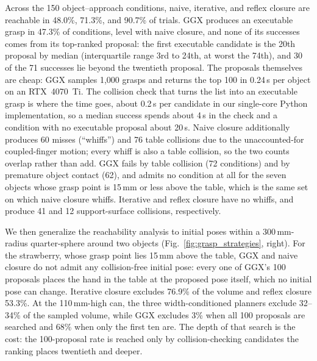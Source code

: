 Across the 150 object--approach conditions, naive, iterative, and
reflex closure are reachable in 48.0\%, 71.3\%, and 90.7\% of trials.
GGX produces an executable grasp in 47.3\% of conditions, level with
naive closure, and none of its successes comes from its top-ranked
proposal: the first executable candidate is the 20th proposal by median
(interquartile range 3rd to 24th, at worst the 74th), and 30 of the 71
successes lie beyond the twentieth proposal. The proposals themselves
are cheap: GGX samples 1{,}000 grasps and returns the top 100 in
0.24\,s per object on an RTX~4070~Ti. The collision check that turns
the list into an executable grasp is where the time goes, about
0.2\,s per candidate in our single-core Python implementation, so a
median success spends about 4\,s in the check and a condition with no
executable proposal about 20\,s. Naive closure additionally produces 60
misses (``whiffs'') and 76 table collisions due to the unaccounted-for
coupled-finger motion; every whiff is also a table collision, so the
two counts overlap rather than add. GGX fails by table collision (72
conditions) and by premature object contact (62), and admits no
condition at all for the seven objects whose grasp point is 15\,mm or
less above the table, which is the same set on which naive closure
whiffs. Iterative and reflex closure have no whiffs, and produce 41 and
12 support-surface collisions, respectively.


%

We then generalize the reachability analysis to initial poses within
a 300\,mm-radius quarter-sphere around two objects
(Fig.~\ref{fig:grasp_strategies}, right). For the strawberry, whose
grasp point lies 15\,mm above the table, GGX and naive closure do not
admit any collision-free initial pose: every one of GGX's 100 proposals
places the hand in the table at the proposed pose itself, which no
initial pose can change. Iterative closure excludes 76.9\% of the
volume and reflex closure 53.3\%. At the 110\,mm-high can, the three
width-conditioned planners exclude 32--34\% of the sampled volume,
while GGX excludes 3\% when all 100 proposals are searched and 68\%
when only the first ten are. The depth of that search is the cost: the
100-proposal rate is reached only by collision-checking candidates the
ranking places twentieth and deeper.


